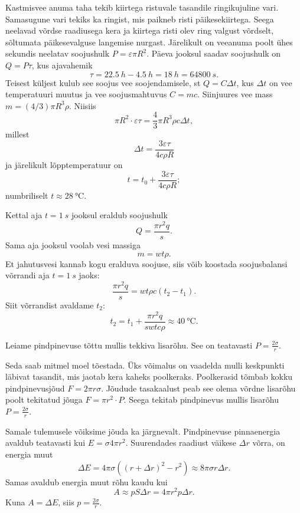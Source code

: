\documentclass[10pt]{article}
\begin{document}
{
\solu
Kastmisvee anuma taha tekib kiirtega ristuvale tasandile ringikujuline vari. Samasugune vari tekiks ka ringist, mis paikneb risti päikesekiirtega. Seega neelavad võrdse raadiusega kera ja kiirtega risti olev ring valgust võrdselt, sõltumata päikesevalguse langemise nurgast. Järelikult on veeanuma poolt ühes sekundis neelatav soojushulk $P = \varepsilon \pi R^2$. Päeva jooksul saadav soojushulk on $Q = P \tau$, kus ajavahemik
\[
\tau = \SI{22,5}{h} - \SI{4,5}{h} = \SI{18}{h} = \SI{64800}{s}.
\]
Teisest küljest kulub see soojus vee soojendamisele, st $Q = C\Delta t$, kus $\Delta t$ on vee temperatuuri muutus ja vee soojusmahtuvus $C = mc$. Siinjuures vee mass $m = (4/3) \pi R^3\rho$. Niisiis 
\[
\pi R^2 \cdot \varepsilon \tau = \frac 43 \pi R^3\rho c\Delta t,
\]
millest
\[
\Delta t = \frac{3\varepsilon \tau}{4c\rho R}
\]
ja järelikult lõpptemperatuur on
\[
t = t_0 + \frac{3\varepsilon \tau}{4c\rho R};
\]
numbriliselt $t \approx \SI{28}{\degreeCelsius}$.
\probend
\bigskip


\solu
Kettal aja $t = \SI{1}{s}$ jooksul eraldub soojushulk
\[
Q = \frac{\pi r^2 q}{s}.
\]
Sama aja jooksul voolab vesi massiga
\[
m = wt\rho.
\]
Et jahutusvesi kannab kogu eralduva soojuse, siis võib koostada soojusbalansi võrrandi aja $t = \SI{1}{s}$ jaoks:
\[
\frac{\pi r^{2} q}{s}=w t \rho c\left(t_{2}-t_{1}\right).
\]
Siit võrrandist avaldame $t_2$:
\[
t_2 = t_1 + \frac{\pi r^2q}{swtc\rho} \approx \SI{40}{\degreeCelsius}.
\]
\probend
\bigskip


\solu
Leiame pindpinevuse tõttu mullis tekkiva lisarõhu. See on teatavasti $P = \frac{2\sigma}{r}$.

Seda saab mitmel moel tõestada. Üks võimalus on vaadelda mulli keskpunkti läbivat tasandit, mis jaotab kera kaheks poolkeraks. Poolkerasid tõmbab kokku pindpinevusjõud $F = 2\pi r\sigma$. Jõudude tasakaalust peab see olema võrdne lisarõhu poolt tekitatud jõuga $F = \pi r^2 \cdot P$. Seega tekitab pindpinevus mullis lisarõhu $P = \frac{2\sigma}{r}$.

Samale tulemusele võiksime jõuda ka järgnevalt. Pindpinevuse pinnaenergia avaldub teatavasti kui $E = \sigma 4\pi r^2$. Suurendades raadiust väikese $\Delta r$ võrra, on energia muut 
\[
\Delta E = 4\pi \sigma ((r+\Delta r)^2-r^2) \approx 8\pi \sigma r\Delta r.
\]
Samas avaldub energia muut rõhu kaudu kui
\[
A \approx pS\Delta r = 4\pi r^2p\Delta r.
\]
Kuna $A = \Delta E$, siis $p = \frac{2\sigma}{r}$.

}
\end{document}
